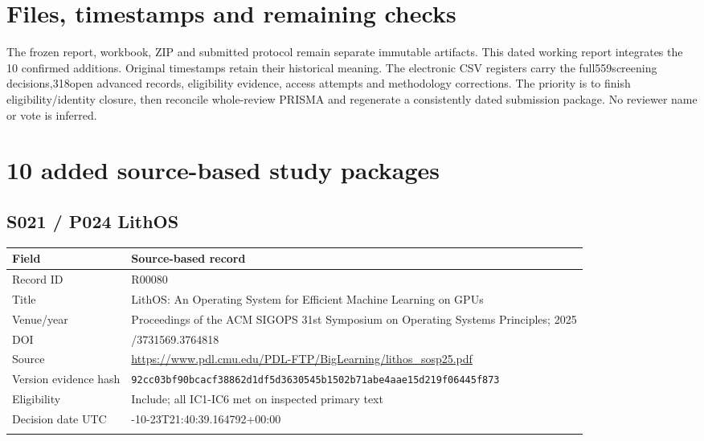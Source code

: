 \section{Files, timestamps and remaining checks}
The frozen report, workbook, ZIP and submitted protocol remain separate immutable artifacts. This dated working report integrates the 10 confirmed additions. Original timestamps retain their historical meaning. The electronic CSV registers carry the full559screening decisions,318open advanced records, eligibility evidence, access attempts and methodology corrections. The priority is to finish eligibility/identity closure, then reconcile whole-review PRISMA and regenerate a consistently dated submission package. No reviewer name or vote is inferred.
\clearpage\section{10 added source-based study packages}\label{app:additions}
\clearpage\subsection{S021 / P024 LithOS}
\cite{s021}
\begin{longtable}{>{\raggedright\arraybackslash}p{}>{\raggedright\arraybackslash}p{}}
\toprule
\textbf{Field} & \textbf{Source-based record}\\\midrule\endhead
Record ID & R00080\\\addlinespace
Title & LithOS: An Operating System for Efficient Machine Learning on GPUs\\\addlinespace
Venue/year & Proceedings of the ACM SIGOPS 31st Symposium on Operating Systems Principles;\allowbreak{} 2025\\\addlinespace
DOI & 10.1145/3731569.3764818\\\addlinespace
Source & \url{https://www.pdl.cmu.edu/PDL-FTP/BigLearning/lithos_sosp25.pdf}\\\addlinespace
Version evidence hash & \nolinkurl{92cc03bf90bcacf38862d1df5d3630545b1502b71abe4aae15d219f06445f873}\\\addlinespace
Eligibility & Include;\allowbreak{} all IC1-IC6 met on inspected primary text\\\addlinespace
Decision date UTC & 2026-10-23T21:40:39.164792+00:00\\\addlinespace
\bottomrule\end{longtable}

